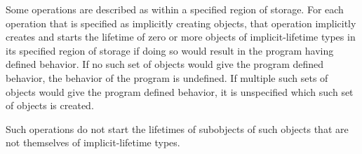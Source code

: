 \pnum
Some operations are described as
within a specified region of storage.
For each operation that is specified as implicitly creating objects,
that operation implicitly creates and starts the lifetime of
zero or more objects of implicit-lifetime types
in its specified region of storage
if doing so would result in the program having defined behavior.
If no such set of objects would give the program defined behavior,
%
%
%
%
%
the behavior of the program is undefined.
If multiple such sets of objects would give the program defined behavior,
it is unspecified which such set of objects is created.
\begin{note}
Such operations do not start the lifetimes of subobjects of such objects
that are not themselves of implicit-lifetime types.
\end{note}

